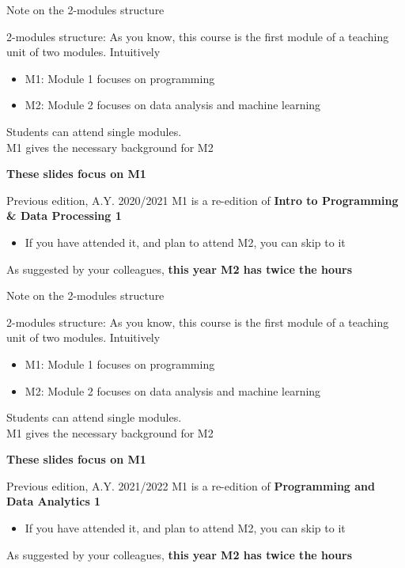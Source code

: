 \documentclass{beamer}%
\begin{document}
\begin{frame}{Note on the 2-modules structure}
	\begin{block}{2-modules structure: \myurl{\homepage}}
		As you know, this course is the first module of a teaching unit of two modules. Intuitively
		\begin{itemize}
			\item M1: Module 1 focuses on programming
			\item M2: Module 2 focuses  on data analysis and machine learning
		\end{itemize}
		Students can attend single modules. \\ M1 gives the necessary background for M2
		\begin{center}\textbf{These slides focus on M1}\end{center}
	\end{block}	
	\begin{block}{Previous edition, A.Y. 2020/2021}
		M1 is a re-edition of \textbf{Intro to Programming \& Data Processing 1}
		\begin{itemize}
			\item If you have attended it, and plan to attend M2, you can skip to it
		\end{itemize}
		As suggested by your colleagues, \textbf{this year M2 has twice the hours}
	\end{block}
\end{frame}

\begin{frame}{Note on the 2-modules structure}
	\begin{block}{2-modules structure: \myurl{\homepage}}
		As you know, this course is the first module of a teaching unit of two modules. Intuitively
		\begin{itemize}
			\item M1: Module 1 focuses on programming
			\item M2: Module 2 focuses  on data analysis and machine learning
		\end{itemize}
		Students can attend single modules. \\ M1 gives the necessary background for M2
		\begin{center}\textbf{These slides focus on M1}\end{center}
	\end{block}	
	\begin{block}{Previous edition, A.Y. 2021/2022}
		M1 is a re-edition of \textbf{Programming and Data Analytics 1}
		\begin{itemize}
			\item If you have attended it, and plan to attend M2, you can skip to it
		\end{itemize}
		As suggested by your colleagues, \textbf{this year M2 has twice the hours}
	\end{block}
\end{frame}
\end{document}

